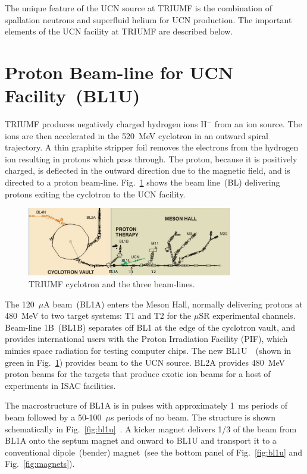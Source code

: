 The unique feature of the UCN source at TRIUMF is the combination of
spallation neutrons and superfluid helium for UCN production. The
important elements of the UCN facility at TRIUMF are described below.


\section{Proton Beam-line for UCN Facility~(BL1U)}
TRIUMF produces negatively charged hydrogen ions H$^-$ from an ion
source. The ions are then accelerated in the 520~MeV cyclotron in an
outward spiral trajectory. A thin graphite stripper foil removes the
electrons from the hydrogen ion resulting in protons which pass
through. The proton, because it is positively charged, is deflected in
the outward direction due to the magnetic field, and is directed to a
proton beam-line.
Fig.~\ref{fig:cyclotron} shows the beam line~(BL) delivering protons
exiting the cyclotron to the UCN facility.

\begin{figure}[h!]
  \centering
  \includegraphics[width=0.8\textwidth]{cyclotron.png}
  \caption{TRIUMF cyclotron and the three beam-lines.}
  \label{fig:cyclotron}
\end{figure}


The 120~$\mu$A beam~(BL1A) enters the Meson Hall, normally delivering
protons at 480~MeV to two target systems: T1 and T2 for the $\mu$SR
experimental channels. Beam-line 1B~(BL1B) separates off BL1 at the
edge of the cyclotron vault, and provides international users with the
Proton Irradiation Facility (PIF), which mimics space radiation for
testing computer chips. The new BL1U~\cite{beamline}~(shown in green
in Fig.~\ref{fig:cyclotron}) provides beam to the UCN source. BL2A
provides 480~MeV proton beams for the targets that produce exotic ion
beams for a host of experiments in ISAC facilities.


The macrostructure of BL1A is in pulses with approximately 1~ms
periods of beam followed by a 50-100~$\mu$s periods of no beam. The
structure is shown schematically in
Fig.~\ref{fig:bl1u}~\cite{Nick_thesis}. A kicker magnet delivers 1/3
of the beam from BL1A onto the septum magnet and onward to BL1U and
transport it to a conventional dipole~(bender) magnet~(see the bottom
panel of Fig.~\ref{fig:bl1u} and Fig.~\ref{fig:magnets}).

